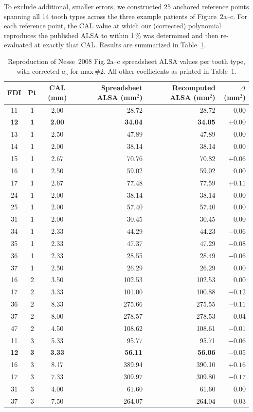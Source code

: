 \documentclass[11pt,a4paper]{article}
\begin{document}
To exclude additional, smaller errors, we constructed 25 anchored
reference points spanning all 14 tooth types across the three example
patients of Figure~2a--c. For each reference point, the CAL value at
which our (corrected) polynomial reproduces the published ALSA to
within 1\,\% was determined and then re-evaluated at exactly that CAL.
Results are summarized in Table~\ref{tab:crossval}.

\begin{table}[h]
\centering
\caption{Reproduction of Nesse~2008 Fig.\,2a--c spreadsheet ALSA values
per tooth type, with corrected $a_5$ for max\,\#2. All other
coefficients as printed in Table~1.}
\label{tab:crossval}
\small
\begin{tabular}{cccrr r}
\toprule
FDI & Pt & CAL (mm) & Spreadsheet ALSA (mm$^2$) & Recomputed ALSA (mm$^2$) & $\Delta$ (mm$^2$) \\
\midrule
11 & 1 & 2.00 & 28.72 & 28.72 & $0.00$ \\
\textbf{12} & \textbf{1} & \textbf{2.00} & \textbf{34.04} & \textbf{34.05} & $+0.00$ \\
13 & 1 & 2.50 & 47.89 & 47.89 & $0.00$ \\
14 & 1 & 2.00 & 38.14 & 38.14 & $0.00$ \\
15 & 1 & 2.67 & 70.76 & 70.82 & $+0.06$ \\
16 & 1 & 2.50 & 59.02 & 59.02 & $0.00$ \\
17 & 1 & 2.67 & 77.48 & 77.59 & $+0.11$ \\
24 & 1 & 2.00 & 38.14 & 38.14 & $0.00$ \\
25 & 1 & 2.00 & 57.40 & 57.40 & $0.00$ \\
31 & 1 & 2.00 & 30.45 & 30.45 & $0.00$ \\
34 & 1 & 2.33 & 44.29 & 44.23 & $-0.06$ \\
35 & 1 & 2.33 & 47.37 & 47.29 & $-0.08$ \\
36 & 1 & 2.33 & 28.55 & 28.49 & $-0.06$ \\
37 & 1 & 2.50 & 26.29 & 26.29 & $0.00$ \\
16 & 2 & 3.50 & 102.53 & 102.53 & $0.00$ \\
17 & 2 & 3.33 & 101.00 & 100.88 & $-0.12$ \\
36 & 2 & 8.33 & 275.66 & 275.55 & $-0.11$ \\
37 & 2 & 8.00 & 278.57 & 278.53 & $-0.04$ \\
47 & 2 & 4.50 & 108.62 & 108.61 & $-0.01$ \\
11 & 3 & 5.33 & 95.77 & 95.71 & $-0.06$ \\
\textbf{12} & \textbf{3} & \textbf{3.33} & \textbf{56.11} & \textbf{56.06} & $-0.05$ \\
16 & 3 & 8.17 & 389.94 & 390.10 & $+0.16$ \\
17 & 3 & 7.33 & 309.97 & 309.80 & $-0.17$ \\
31 & 3 & 4.00 & 61.60 & 61.60 & $0.00$ \\
37 & 3 & 7.50 & 264.07 & 264.04 & $-0.03$ \\
\bottomrule
\end{tabular}
\end{table}
\end{document}
